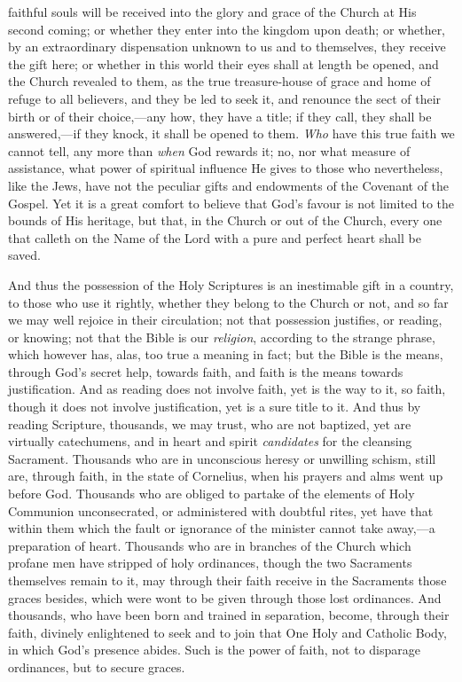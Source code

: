 faithful souls will be received into the glory and grace of the Church
at His second coming; or whether they enter into the kingdom upon
death; or whether, by an extraordinary dispensation unknown to us and
to themselves, they receive the gift here; or whether in this world
their eyes shall at length be opened, and the Church revealed to them,
as the true treasure-house of grace and home of refuge to all
believers, and they be led to seek it, and renounce the sect of their
birth or of their choice,—any how, they have a title; if they call,
they shall be answered,—if they knock, it shall be opened to them. \emph{Who}
have this true faith we cannot tell, any more than \emph{when} God
rewards it; no, nor what measure of assistance, what power of
spiritual influence He gives to those who nevertheless, like the Jews,
have not the peculiar gifts and endowments of the Covenant of the
Gospel. Yet it is a great comfort to believe that God's favour is not
limited to the bounds of His heritage, but that, in the Church or out
of the Church, every one that calleth on the Name of the Lord with a
pure and perfect heart shall be saved.

And thus the possession of the Holy Scriptures is an inestimable
gift in a country, to those who use it rightly, whether they belong to
the Church or not, and so far we may well rejoice in their
circulation; not that possession justifies, or reading, or knowing;
not that the Bible is our \emph{religion}, according to the strange
phrase, which however has, alas, too true a meaning in fact; but the
Bible is the means, through God's secret help, towards faith, and
faith is the means towards justification. And as reading does not
involve faith, yet is the way to it, so faith, though it does not
involve justification, yet is a sure title to it. And thus by reading
Scripture, thousands, we may trust, who are not baptized, yet are
virtually catechumens, and in heart and spirit \emph{candidates} for
the cleansing Sacrament. Thousands who are in unconscious heresy or
unwilling schism, still are, through faith, in the state of Cornelius,
when his prayers and alms went up before God. Thousands who are
obliged to partake of the elements of Holy Communion unconsecrated, or
administered with doubtful rites, yet have that within them which the
fault or ignorance of the minister cannot take away,—a preparation
of heart. Thousands who are in branches of the Church which profane
men have stripped of holy ordinances, though the two Sacraments
themselves remain to it, may through their faith receive in the
Sacraments those graces besides, which were wont to be given through
those lost ordinances. And thousands, who have been born and trained
in separation, become, through their faith, divinely enlightened to
seek and to join that One Holy and Catholic Body, in which God's
presence abides. Such is the power of faith, not to disparage
ordinances, but to secure graces.

